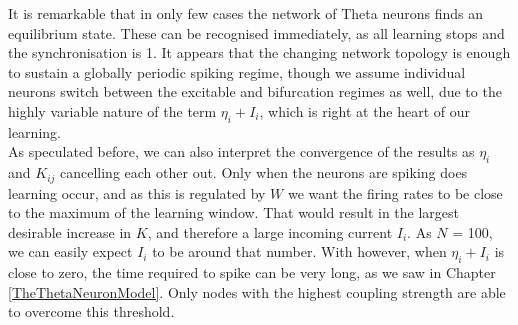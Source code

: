 It is remarkable that in only few cases the network of Theta neurons finds an equilibrium state. These can be recognised immediately, as all learning stops and the synchronisation is 1. It appears that the changing network topology is enough to sustain a globally periodic spiking regime, though we assume individual neurons switch between the excitable and bifurcation regimes as well, due to the highly variable nature of the term $\eta_i + I_i$, which is right at the heart of our learning. \\

As speculated before, we can also interpret the convergence of the results as $\eta_i$ and $K_{ij}$ cancelling each other out. Only when the neurons are spiking does learning occur, and as this is regulated by $W$ we want the firing rates to be close to the maximum of the learning window. That would result in the largest desirable increase in $K$, and therefore a large incoming current $I_i$. As $N$ = 100, we can easily expect $I_i$ to be around that number. With \IP however, when $\eta_i + I_i$ is close to zero, the time required to spike can be very long, as we saw in Chapter \ref{TheThetaNeuronModel}. Only nodes with the highest coupling strength are able to overcome this threshold.

